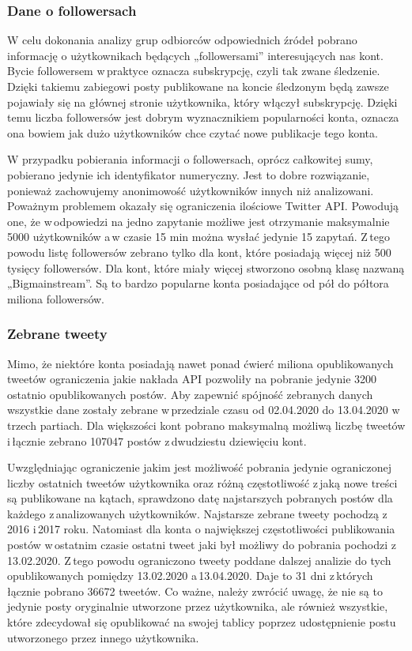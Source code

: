 \subsubsection{Dane o followersach}
W celu dokonania analizy grup odbiorców odpowiednich źródeł pobrano informację o użytkownikach będących „followersami” interesujących nas kont. Bycie followersem w\,praktyce oznacza subskrypcję, czyli tak zwane śledzenie. Dzięki takiemu zabiegowi posty publikowane na koncie śledzonym będą zawsze pojawiały się na głównej stronie użytkownika, który włączył subskrypcję. Dzięki temu liczba followersów jest dobrym wyznacznikiem popularności konta, oznacza ona bowiem jak dużo użytkowników chce czytać nowe publikacje tego konta. 
\par
W przypadku pobierania informacji o followersach, oprócz całkowitej sumy, pobierano jedynie ich identyfikator numeryczny. Jest to dobre rozwiązanie, ponieważ zachowujemy anonimowość użytkowników innych niż analizowani. Poważnym problemem okazały się ograniczenia ilościowe Twitter API. Powodują one, że w\,odpowiedzi na jedno zapytanie możliwe jest otrzymanie maksymalnie 5000 użytkowników a\,w czasie 15 min można wysłać jedynie 15 zapytań. Z\,tego powodu listę followersów zebrano tylko dla kont, które posiadają więcej niż 500 tysięcy followersów. Dla kont, które miały więcej stworzono osobną klasę nazwaną „Bigmainstream”. Są to bardzo popularne konta posiadające od pół do półtora miliona followersów. 
\subsubsection{Zebrane tweety}
Mimo, że niektóre konta posiadają nawet ponad ćwierć miliona opublikowanych tweetów ograniczenia jakie nakłada API pozwoliły na pobranie jedynie 3200 ostatnio opublikowanych postów. Aby zapewnić spójność zebranych danych wszystkie dane zostały zebrane w\,przedziale czasu od 02.04.2020 do 13.04.2020 w\,trzech partiach. Dla większości kont pobrano maksymalną możliwą liczbę tweetów i\,łącznie zebrano 107047 postów z\,dwudziestu dziewięciu kont. 
\par
Uwzględniając ograniczenie jakim jest możliwość pobrania jedynie ograniczonej liczby ostatnich tweetów użytkownika oraz różną częstotliwość z\,jaką nowe treści są publikowane na kątach, sprawdzono datę najstarszych pobranych postów dla każdego z\,analizowanych użytkowników. Najstarsze zebrane tweety pochodzą z\,2016 i\,2017 roku.  Natomiast dla konta o największej częstotliwości publikowania postów w\,ostatnim czasie ostatni tweet jaki był możliwy do pobrania pochodzi z\,13.02.2020. Z\,tego powodu ograniczono tweety poddane dalszej analizie do tych opublikowanych pomiędzy 13.02.2020 a\,13.04.2020. Daje to 31 dni z\,których łącznie pobrano 36672 tweetów. Co ważne, należy zwrócić uwagę, że nie są to jedynie posty oryginalnie utworzone przez użytkownika, ale również wszystkie, które zdecydował się opublikować na swojej tablicy poprzez udostępnienie postu utworzonego przez innego użytkownika. 

